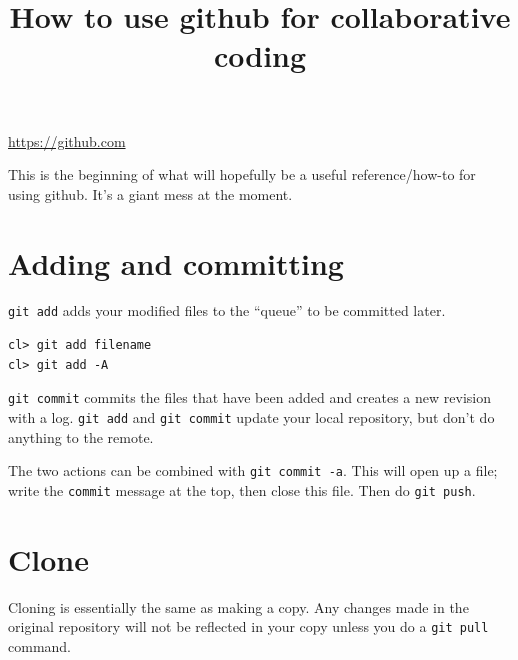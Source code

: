 \documentclass{article}
\title{How to use github for collaborative coding}
\date{}
\begin{document}
\maketitle

\url{https://github.com}

This is the beginning of what will hopefully be a useful reference/how-to
for using github. It's a giant mess at the moment.

\section{Adding and committing}
\verb|git add| adds your modified files to the ``queue'' to be committed
later.

\begin{verbatim}
cl> git add filename
cl> git add -A
\end{verbatim}

\verb|git commit| commits the files that have been added and creates a
new revision with a log. \verb|git add| and \verb|git commit| update your
local repository, but don't do anything to the remote.

The two actions
can be combined with \verb|git commit -a|. This will open up a file;
write the \verb|commit| message at the top, then close this file.
Then do \verb|git push|.

\section{Clone}
Cloning is essentially the same as making a copy. Any changes made
in the original repository will not be reflected in your copy unless
you do a \texttt{git pull} command.
\end{document}
